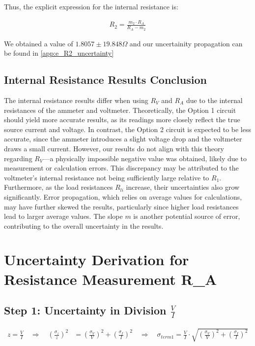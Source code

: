 \documentclass{article} %
\begin{document}
Thus, the explicit expression for the internal resistance is:

\begin{align*}
R_{2} = \frac{m_2 \cdot R_A}{R_A - m_2}
\end{align*}

We obtained a value of $1.8057 \pm 19.848 \Omega$ and our uncertainity propagation can be found in \ref{app:e_R2_uncertainty}

\subsection{Internal Resistance Results Conclusion}

The internal resistance results differ when using $R_V$ and $R_A$ due to the internal resistances of the ammeter and voltmeter. 
Theoretically, the Option 1 circuit should yield more accurate results, as its readings more closely reflect the true source current and voltage. 
In contrast, the Option 2 circuit is expected to be less accurate, since the ammeter introduces a slight voltage drop and the voltmeter draws a small current. 
However, our results do not align with this theory regarding $R_V$—a physically impossible negative value was obtained, likely due to measurement or calculation errors. 
This discrepancy may be attributed to the voltmeter's internal resistance not being sufficiently large relative to $R_1$. Furthermore, as the load resistances $R_{li}$ increase, their uncertainties also grow significantly. 
Error propagation, which relies on average values for calculations, may have further skewed the results, particularly since higher load resistances lead to larger average values. 
The slope $m$ is another potential source of error, contributing to the overall uncertainty in the results.

\label{last_page}

\newpage
% 
% 

\appendix

\section{Uncertainty Derivation for Resistance Measurement R\_A}
\label{app:a_RA_uncertainty}

\subsection*{Step 1: Uncertainty in Division $\frac{V}{I}$}
\begin{align*}
z = \frac{V}{I} \quad \Rightarrow \quad \left(\frac{\sigma_z}{z}\right)^2 &= \left(\frac{\sigma_V}{V}\right)^2 + \left(\frac{\sigma_I}{I}\right)^2 \quad \Rightarrow \quad \sigma_{term1} = \frac{V}{I} \cdot \sqrt{\left(\frac{\sigma_V}{V}\right)^2 + \left(\frac{\sigma_I}{I}\right)^2}
\end{align*}
\end{document}
